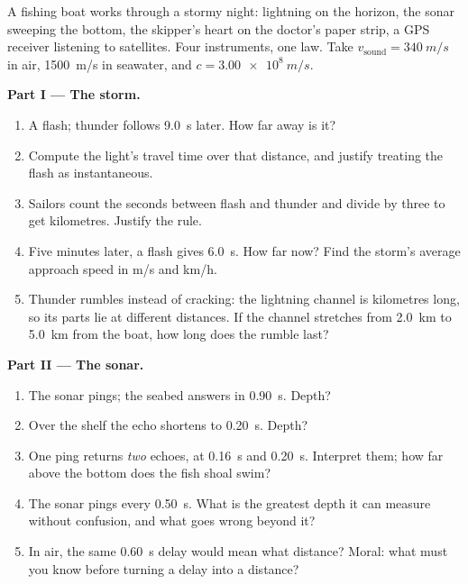 \begin{problem}[{Weekend problem --- reading the world's signals: one
law, $d = v\,t$, ranges a storm, maps a seabed, counts a heartbeat and
teases out how GPS works}]
\label{pb:g10:signals-and-waves:1}
A fishing boat works through a stormy night: lightning on the horizon,
the sonar sweeping the bottom, the skipper's heart on the doctor's paper
strip, a GPS receiver listening to satellites. Four instruments, one
law. Take $v_{\text{sound}} = \qty{340}{m/s}$ in air, \qty{1500}{m/s} in
seawater, and $c = \qty{3.00e8}{m/s}$.

\medskip
\noindent\textbf{Part I --- The storm.}
\begin{enumerate}
  \item A flash; thunder follows \qty{9.0}{s} later. How far away is it?
  \item Compute the light's travel time over that distance, and justify
        treating the flash as instantaneous.
  \item Sailors count the seconds between flash and thunder and divide
        by three to get kilometres. Justify the rule.
  \item Five minutes later, a flash gives \qty{6.0}{s}. How far now?
        Find the storm's average approach speed in \unit{m/s} and \unit{km/h}.
  \item Thunder rumbles instead of cracking: the lightning channel is
        kilometres long, so its parts lie at different distances. If the
        channel stretches from \qty{2.0}{km} to \qty{5.0}{km} from the
        boat, how long does the rumble last?
\end{enumerate}

\medskip
\noindent\textbf{Part II --- The sonar.}
\begin{enumerate}[resume]
  \item The sonar pings; the seabed answers in \qty{0.90}{s}. Depth?
  \item Over the shelf the echo shortens to \qty{0.20}{s}. Depth?
  \item One ping returns \emph{two} echoes, at \qty{0.16}{s} and
        \qty{0.20}{s}. Interpret them; how far above the bottom does the
        fish shoal swim?
  \item The sonar pings every \qty{0.50}{s}. What is the greatest depth
        it can measure without confusion, and what goes wrong beyond it?
  \item In air, the same \qty{0.60}{s} delay would mean what distance?
        Moral: what must you know before turning a delay into a
        distance?
\end{enumerate}


\end{problem}
